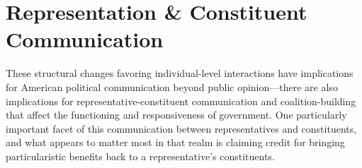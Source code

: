 \documentclass[12pt]{article}
\begin{document}


\section*{Representation \& Constituent Communication}
These structural changes favoring individual-level interactions have implications for American political communication beyond public opinion---there are also implications for representative-constituent communication and coalition-building that affect the functioning and responsiveness of government.  One particularly important facet of this communication between representatives and constituents, and what appears to matter most in that realm is claiming credit for bringing particularistic benefits back to a representative's constituents. 
\end{document}
